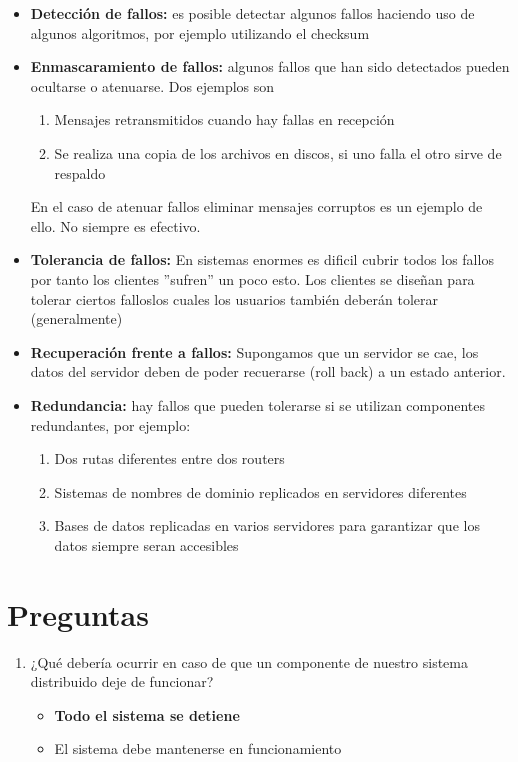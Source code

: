 \begin{itemize}
    \item { \textbf{Detección de fallos: } es posible detectar algunos fallos haciendo uso de algunos algoritmos, por ejemplo utilizando el checksum }
    \item { \textbf{Enmascaramiento de fallos: } algunos fallos que han sido detectados pueden ocultarse o atenuarse. Dos ejemplos son 
        \begin{enumerate}
            \item {Mensajes retransmitidos cuando hay fallas en recepción}
            \item {Se realiza una copia de los archivos en discos, si uno falla el otro sirve de respaldo}
        \end{enumerate}
        En el caso de atenuar fallos eliminar mensajes corruptos es un ejemplo de ello. No siempre es efectivo. }
    \item { \textbf{Tolerancia de fallos: } En sistemas enormes es dificil cubrir todos los fallos por tanto los clientes ''sufren'' un poco esto. Los clientes se diseñan para tolerar ciertos falloslos cuales los usuarios también deberán tolerar (generalmente)}
    \item { \textbf{Recuperación frente a fallos: } Supongamos que un servidor se cae, los datos del servidor deben de poder recuerarse (roll back) a un estado anterior. }
    \item { \textbf{Redundancia: } hay fallos que pueden tolerarse si se utilizan componentes redundantes, por ejemplo: 
        \begin{enumerate}
            \item {Dos rutas diferentes entre dos routers}
            \item {Sistemas de nombres de dominio replicados en servidores diferentes}
            \item {Bases de datos replicadas en varios servidores para garantizar que los datos siempre seran accesibles}
        \end{enumerate}
        }
\end{itemize}

\section{Preguntas}
\begin{enumerate}
    \item {¿Qué debería ocurrir en caso de que un componente de nuestro sistema distribuido deje de funcionar? 
    \begin{itemize}
        \item {\textbf{Todo el sistema se detiene}}
        \item {El sistema debe mantenerse en funcionamiento}
    \end{itemize}}
\end{enumerate}